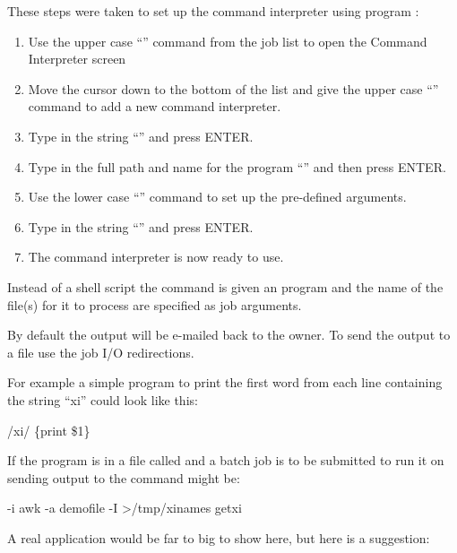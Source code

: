 These steps were taken to set up the  command interpreter using program \PrBtq{}:

\begin{enumerate}
\item Use the upper case ``'' command from the job list to open the Command Interpreter screen
\item Move the cursor down to the bottom of the list and give the upper case ``'' command to add a new command
interpreter.
\item Type in the string ``'' and press ENTER.
\item Type in the full path and name for the  program ``''
and then press ENTER.
\item Use the lower case ``'' command to set up the pre-defined arguments.
\item Type in the string ``'' and press ENTER.
\item The  command interpreter is now ready to use.
\end{enumerate}
Instead of a shell script the \PrBtr{} command is given an 
program and the name of the file(s) for it to process are specified as
job arguments.

By default the output will be e-mailed back to the owner. To send the
output to a file use the job I/O redirections.

For example a simple  program to print the first word from each line containing the string
``xi'' could look like this:

\begin{expara}

/xi/ \{print \$1\}

\end{expara}

If the program is in a file called  and a batch job is to be submitted to run it on
 sending output to  the \PrBtr{} command might be:

\begin{expara}

\BtrName{} -i awk -a demofile -I {\textquotedbl}{\textgreater}/tmp/xinames{\textquotedbl} getxi

\end{expara}

A real application would be far to big to show here, but here is a suggestion:

